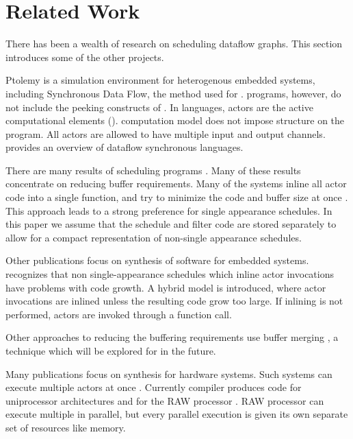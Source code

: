 \section{Related Work}
\label{chpt:related}

There has been a wealth of research on scheduling dataflow graphs.
This section introduces some of the other projects.

Ptolemy \cite{ptolemyoverview} is a simulation environment for
heterogenous embedded systems, including Synchronous Data Flow,
the method used for {\StreamIt}. {\SDF} programs, however, do not
include the peeking constructs of {\StreamIt}.  In {\SDF} languages,
actors are the active computational elements ({\filters}).  {\SDF}
computation model does not impose structure on the program.  All
actors are allowed to have multiple input and output channels.
\cite{benveniste93dataflow} provides an overview of dataflow
synchronous languages.

There are many results of scheduling {\SDF} programs
\cite{leesdf}. Many of these results concentrate on reducing buffer
requirements. Many of the systems inline all actor code into a single
function, and try to minimize the code and buffer size at once
\cite{bhattacharyya99synthesis}.  This approach leads to a strong
preference for single appearance schedules.  In this paper we assume
that the schedule and filter code are stored separately to allow for a
compact representation of non-single appearance schedules.

Other publications focus on synthesis of software for embedded
systems. \cite{bhat1999x1} recognizes that non single-appearance
schedules which inline actor invocations have problems with code
growth.  A hybrid model is introduced, where actor invocations are
inlined unless the resulting code grow too large. If inlining is
not performed, actors are invoked through a function call.

Other approaches to reducing the buffering requirements use buffer
merging \cite{murthy99buffer}, a technique which will be explored for
{\StreamIt} in the future.

Many publications focus on synthesis for hardware systems.  Such
systems can execute multiple actors at once
\cite{govindarajan-minimizing}.  Currently {\StreamIt} compiler
produces code for uniprocessor architectures \cite{streamittech2}
and for the RAW processor \cite{gordo-thesis}.  RAW processor can
execute multiple {\filters} in parallel, but every parallel
execution is given its own separate set of resources like memory.

